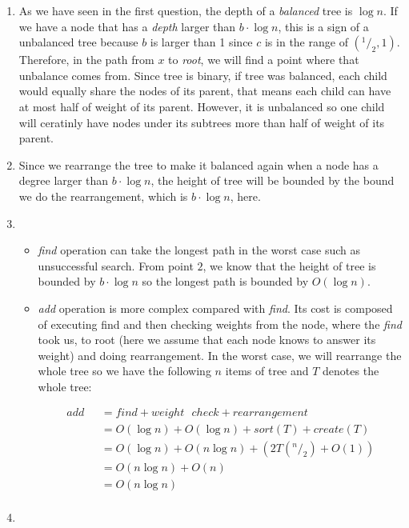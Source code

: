 \begin{enumerate}
  \item
    As we have seen in the first question, the depth of a \textit{balanced} tree is $\log n$. If we have a node that has a \textit{depth} larger than $b \cdot \log n$, this is a sign of a unbalanced tree because $b$ is larger than 1 since $c$ is in the range of $(^1/_2, 1)$. Therefore, in the path from $x$ to \textit{root}, we will find a point where that unbalance comes from. Since tree is binary, if tree was balanced, each child would equally share the nodes of its parent, that means each child can have at most half of weight of its parent. However, it is unbalanced so one child will ceratinly have nodes under its subtrees more than half of weight of its parent.

  \item
   Since we rearrange the tree to make it balanced again when a node has a degree larger than $b \cdot \log n$, the height of tree will be bounded by the bound we do the rearrangement, which is $b \cdot \log n$, here.
  
  \item
  \begin{itemize}
    \item \textit{find} operation can take the longest path in the worst case such as unsuccessful search. From point $2$, we know that the height of tree is bounded by $b \cdot \log n$ so the longest path is bounded by $O(\log n)$.
    
    \item \textit{add} operation is more complex compared with \textit{find}. Its cost is composed of executing find and then checking weights from the node, where the \textit{find} took us, to root (here we assume that each node knows to answer its weight) and doing rearrangement. In the worst case, we will rearrange the whole tree so we have the following $n$ items of tree and $T$ denotes the whole tree:
    
    \begin{align*}
      add\text{ } &= find + weight\text{ }check + rearrangement \\
                  &= O(\log n) + O(\log n) + sort(T) + create(T) \\
                  &= O(\log n) + O(n \log n) + (2T(^n/_2) + O(1)) \\
                  &= O(n \log n) + O(n) \\
                  &= O(n \log n) \\
    \end{align*}
  \end{itemize}
  
  \item


\end{enumerate}